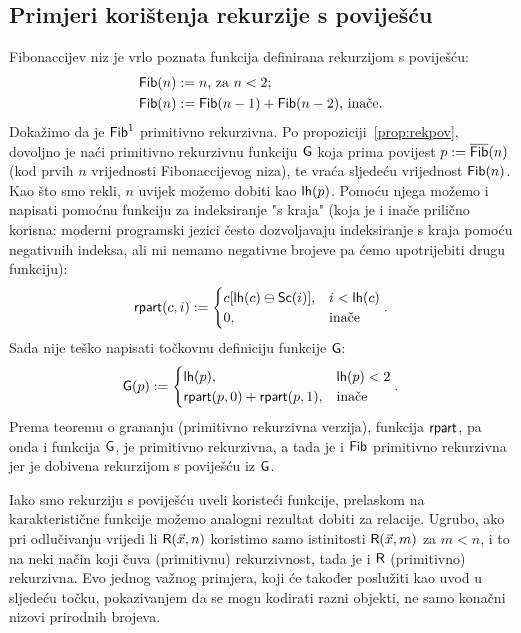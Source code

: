 \subsection{Primjeri korištenja rekurzije s poviješću}

\begin{primjer}
Fibonaccijev niz je vrlo poznata funkcija definirana rekurzijom s poviješću:
\begin{align}
    \mathsf{Fib}(n)&:=n\text{, za  $n<2$;}\\
    \mathsf{Fib}(n)&:=\mathsf{Fib}(n-1)+\mathsf{Fib}(n-2)\text{, inače.}
\end{align}
Dokažimo da je $\mathsf{Fib}^1$ primitivno rekurzivna. Po propoziciji~\ref{prop:rekpov}, dovoljno je naći primitivno rekurzivnu funkciju $\mathsf G$ koja prima povijest $p:=\overline{\mathsf{Fib}}(n)$ (kod prvih $n$ vrijednosti Fibonaccijevog niza), te vraća sljedeću vrijednost $\mathsf{Fib}(n)$. Kao što smo rekli, $n$ uvijek možemo dobiti kao $\mathsf{lh}(p)$. Pomoću njega možemo i napisati pomoćnu funkciju za indeksiranje "s kraja" (koja je i inače prilično korisna: moderni programski jezici često dozvoljavaju indeksiranje s kraja pomoću negativnih indeksa, ali mi nemamo negativne brojeve pa ćemo upotrijebiti drugu funkciju):
\begin{equation}\label{eq:rpartdef}
    \mathsf{rpart}(c,i):=\begin{cases}
    c[\mathsf{lh}(c)\ominus\mathsf{Sc}(i)],&i<\mathsf{lh}(c)\\
    0,&\text{inače}
    \end{cases}\text.
\end{equation}
Sada nije teško napisati točkovnu definiciju funkcije $\mathsf G$:
\begin{equation}
    \mathsf G(p):=\begin{cases}
    \mathsf{lh}(p),&\mathsf{lh}(p)<2\\
    \mathsf{rpart}(p,0)+\mathsf{rpart}(p,1),&\text{inače}
    \end{cases}\text.
\end{equation}
Prema teoremu o grananju (primitivno rekurzivna verzija), funkcija $\mathsf{rpart}$, pa onda i funkcija $\mathsf G$, je primitivno rekurzivna, a tada je i $\mathsf{Fib}$ primitivno rekurzivna jer je dobivena rekurzijom s poviješću iz $\mathsf G$.
\end{primjer}

Iako smo rekurziju s poviješću uveli koristeći funkcije, prelaskom na karakteristične funkcije možemo analogni rezultat dobiti za relacije. Ugrubo, ako pri odlučivanju vrijedi li $\mathsf R(\vec x,n)$ koristimo samo istinitosti $\mathsf R(\vec x,m)$ za $m<n$, i to na neki način koji čuva (primitivnu) rekurzivnost, tada je i $\mathsf R$ (primitivno) rekurzivna. Evo jednog važnog primjera, koji će također poslužiti kao uvod u sljedeću točku, pokazivanjem da se mogu kodirati razni objekti, ne samo konačni nizovi prirodnih brojeva.

